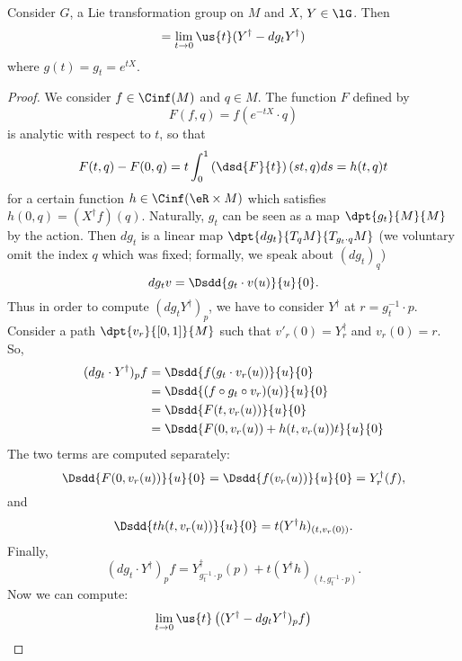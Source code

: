 \begin{theorem}
	Consider $G$, a Lie transformation group on $M$ and $X$, $Y\in\lG$. Then
	\begin{equation}
		[X^{\dag},Y^{\dag}]=\lim_{t\to 0}\us{t}(Y^{\dag}-dg_t Y^{\dag})
	\end{equation}
	where $g(t)=g_t=e^{tX}$.
\end{theorem}

\begin{proof}
	We consider $f\in\Cinf(M)$ and $q\in M$. The function $F$ defined by
	\begin{equation}
		F(f,q)=f(e^{-tX}\cdot q)
	\end{equation}
	is analytic with respect to $t$, so that
	\begin{equation}\label{eq:def_F_h}
		F(t,q)-F(0,q)=t\int^1_0\left(\dsd{F}{t}\right)(st,q)ds=h(t,q)t
	\end{equation}
	for a certain function $h\in\Cinf(\eR\times M)$ which satisfies $h(0,q)=(X^{\dag} f)(q)$.
	Naturally, $g_t$ can be seen as a map $\dpt{g_t}{M}{M}$ by the action. Then $dg_t$ is a linear map $\dpt{dg_t}{T_qM}{T_{g_t\cdot q}M}$  (we voluntary omit the index $q$ which was fixed; formally, we speak about $(dg_t)_q$)
	\[
		dg_tv=\Dsdd{g_t\cdot v(u)}{u}{0}.
	\]
	Thus in order to compute $(dg_t Y^{\dag})_p$, we have to consider $Y^{\dag}$ at $r=g_t^{-1}\cdot p$. Consider a path $\dpt{v_r}{[0,1]}{M}$ such that $v'_r(0)=Y^{\dag}_r$ and $v_r(0)=r$. So,
	\begin{equation}
		\begin{split}
			(dg_t\cdot Y^{\dag})_pf&=\Dsdd{ f(g_t\cdot v_r(u)) }{u}{0}\\
			&=\Dsdd{ (f\circ g_t\circ v_r)(u) }{u}{0}\\
			&=\Dsdd{ F(t,v_r(u)) }{u}{0}\\
			&=\Dsdd{ F(0,v_r(u))+h(t,v_r(u))t }{u}{0}
		\end{split}
	\end{equation}
	The two terms are computed separately:
	\[
		\Dsdd{ F(0,v_r(u)) }{u}{0}=\Dsdd{ f(v_r(u)) }{u}{0}=Y^{\dag}_r(f),
	\]
	and
	\[
		\Dsdd{ th(t,v_r(u)) }{u}{0}=t(Y^{\dag} h)_{(t,v_r(0))}.
	\]
	Finally,
	\begin{equation}\label{eq:Y_h}
		(dg_t\cdot Y^{\dag})_pf=Y^{\dag}_{g_t^{-1}\cdot p}(p)+t(Y^{\dag} h)_{(t,g_t^{-1}\cdot p)}.
	\end{equation}
	Now we can compute:
	\begin{equation}
		\begin{aligned}
			\lim_{t\to 0}\us{t}\left( (Y^{\dag}-dg_tY^{\dag})_pf \right)

\end{aligned}
\end{equation}
\end{proof}

